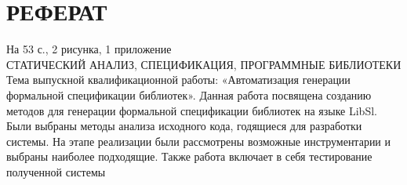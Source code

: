 \chapter*{РЕФЕРАТ}
\thispagestyle{empty}

На 53 с., 2 рисунка, 1 приложение \\

СТАТИЧЕСКИЙ АНАЛИЗ, СПЕЦИФИКАЦИЯ, ПРОГРАММНЫЕ БИБЛИОТЕКИ \\
Тема выпускной квалификационной работы: «Автоматизация генерации формальной спецификации библиотек».
Данная работа посвящена созданию методов для генерации формальной спецификации библиотек на языке LibSl.
Были выбраны методы анализа исходного кода, годящиеся для разработки системы.
На этапе реализации были рассмотрены возможные инструментарии и выбраны наиболее подходящие.
Также работа включает в себя тестирование полученной системы